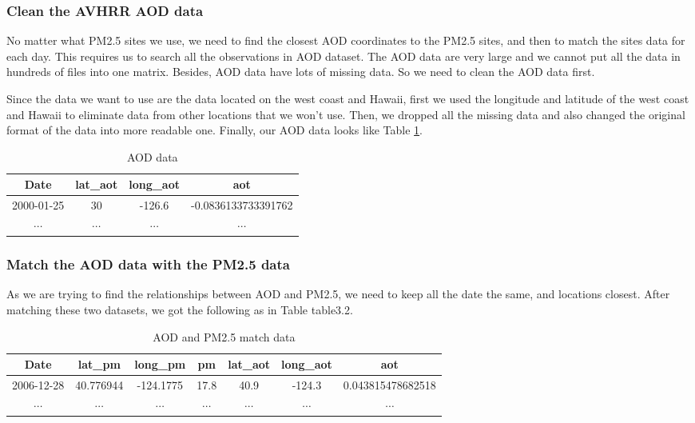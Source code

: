 \documentclass[12pt]{article}
\begin{document}
\subsubsection{Clean the AVHRR AOD data}

No matter what PM2.5 sites we use, we need to find the closest AOD coordinates to the PM2.5 sites, and then to match the sites data for each day. This requires us to search all the observations in AOD dataset. The AOD data are very large and we cannot put all the data in hundreds of files into one matrix. Besides, AOD data have lots of missing data. So we need to clean the AOD data first. 

Since the data we want to use are the data located on the west coast and Hawaii, first we used the longitude and latitude of the west coast and Hawaii to eliminate data from other locations that we won\rq t use. Then, we dropped all the missing data and also changed the original format of the data into more readable one. Finally, our AOD data looks like Table \ref{table3.1}. 

\begin{table}[!h]
\centering
\begin{tabular}{|c|c|c|c|}
\hline 
Date & lat\_aot & long\_aot & aot\\
\hline
2000-01-25 & 30 & -126.6 & -0.0836133733391762 \\
\hline
$\cdots$ & $\cdots$ & $\cdots$ & $\cdots$\\
\hline
\end{tabular}
\caption{AOD data}
\label{table3.1}
\end{table}

\subsubsection{Match the AOD data with the PM2.5 data}
As we are trying to find the relationships between AOD and PM2.5, we need to keep all the date the same, and locations closest. After matching these two datasets, we got the following as in Table {table3.2}.

\begin{table}[!h]
\centering
\begin{tabular}{|c|c|c|c|c|c|c|}
\hline 
Date & lat\_pm & long\_pm & pm & lat\_aot & long\_aot & aot\\
\hline
2006-12-28 & 40.776944 & -124.1775 & 17.8 & 40.9 & -124.3 & 0.043815478682518\\
\hline
$\cdots$ & $\cdots$ & $\cdots$ & $\cdots$ & $\cdots$ & $\cdots$ & $\cdots$\\
\hline
\end{tabular}
\caption{AOD and PM2.5 match data}
\label{table3.2}
\end{table}
\end{document}
